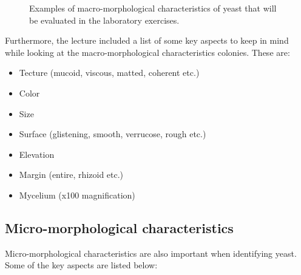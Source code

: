 \begin{figure}[h]
    \centering
    \caption{Examples of macro-morphological characteristics of yeast that will be evaluated in the laboratory exercises.}
    \label{fig:Macromorp}
\end{figure}

Furthermore, the lecture included a list of some key aspects to keep in mind while looking at the macro-morphological characteristics colonies. These are:
\begin{highlight}
    \begin{itemize}
        \item Tecture (mucoid, viscous, matted, coherent etc.)
        \item Color
        \item Size
        \item Surface (glistening, smooth, verrucose, rough etc.)
        \item Elevation
        \item Margin (entire, rhizoid etc.)
        \item Mycelium (x100 magnification)
    \end{itemize}
\end{highlight}

\subsection{Micro-morphological characteristics}
Micro-morphological characteristics are also important when identifying yeast. Some of the key aspects are listed below:

